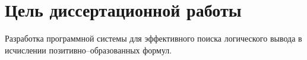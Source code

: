







\section*{Цель диссертационной работы} 
Разработка программной системы для эффективного поиска логического вывода в исчислении позитивно--образованных формул.


